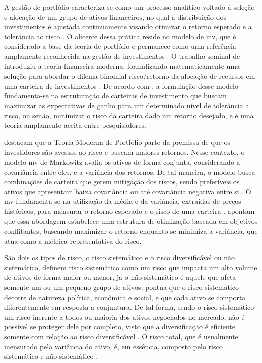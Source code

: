 A gestão de portfólio caracteriza-se como um processo analítico voltado à seleção e alocação de um grupo de ativos financeiros, no qual a distribuição dos investimentos é ajustada continuamente visando otimizar o retorno esperado e a tolerância ao risco \cite{chaweewanchon2022markowitz}. O alicerce dessa prática reside no modelo de \ac{mv}, que é considerado a base da teoria de portfólio e permanece como uma referência amplamente reconhecida na gestão de investimentos \cite{chaweewanchon2022markowitz}. O trabalho seminal de  introduziu a teoria financeira moderna, formalizando matematicamente uma solução para abordar o dilema binomial risco/retorno da alocação de recursos em uma carteira de investimentos \cite{wang2020portfolio}. De acordo com , a formulação desse modelo fundamenta-se na estruturação de carteiras de investimento que buscam maximizar as expectativas de ganho para um determinado nível de tolerância a risco, ou senão, minimizar o risco da carteira dado um retorno desejado, e é uma teoria amplamente aceita entre pesquisadores.

 destacam que a Teoria Moderna de Portfólio parte da premissa de que os investidores são avessos ao risco e buscam maiores retornos. Nesse contexto, o modelo \acs{mv} de Markowitz avalia os ativos de forma conjunta, considerando a covariância entre eles, e a variância dos retornos. De tal maneira, o modelo busca combinações de carteira que gerem mitigação dos riscos, sendo preferíveis os ativos que apresentam baixa covariância ou até covariância negativa entre si \cite{assaf2014financas}. O \acs{mv} fundamenta-se na utilização da média e da variância, extraídas de preços históricos, para mensurar o retorno esperado e o risco de uma carteira \cite{chaweewanchon2022markowitz}.  apontam que essa abordagem estabelece uma estrutura de otimização baseada em objetivos conflitantes, buscando maximizar o retorno enquanto se minimiza a variância, que atua como a métrica representativa do risco.

São dois os tipos de risco, o risco sistemático e o risco diversificável ou não sistemático,  definem risco sistemático como um risco que impacta um alto volume de ativos de forma maior ou menor, ja o não sistemático é aquele que afeta somente um ou um pequeno grupo de ativos.  pontua que o risco sistemático decorre de natureza política, econômica e social, e que cada ativo se comporta diferentemente em resposta a conjuntura. De tal forma, sendo o risco sistemático um risco inerente a todos ou maioria dos ativos negociados no mercado, não é possível se proteger dele por completo, visto que a diversificação é eficiente somente com relação ao risco diversificável \cite{assaf2014financas}. O risco total, que é usualmente mensurado pela variância do ativo, é, em essência, composto pelo risco sistemático e não sistemático \cite{ross2006fundamentals}.

